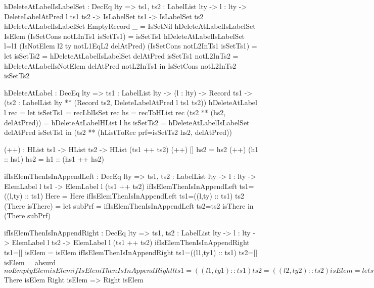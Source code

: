 \begin{code}
hDeleteAtLabelIsLabelSet : DecEq lty => 
  {ts1, ts2 : LabelList lty} -> {l : lty} -> 
  DeleteLabelAtPred l ts1 ts2 -> IsLabelSet ts1 -> IsLabelSet ts2
hDeleteAtLabelIsLabelSet EmptyRecord _ = IsSetNil
hDeleteAtLabelIsLabelSet IsElem (IsSetCons notLInTs1 isSetTs1) = 
  isSetTs1
hDeleteAtLabelIsLabelSet {l=l1} (IsNotElem {l2} {ty} notL1EqL2 
  delAtPred) (IsSetCons notL2InTs1 isSetTs1) = 
  let isSetTs2 = hDeleteAtLabelIsLabelSet delAtPred isSetTs1
      notL2InTs2 = hDeleteAtLabelIsNotElem delAtPred notL2InTs1
  in IsSetCons notL2InTs2 isSetTs2

hDeleteAtLabel : DecEq lty => {ts1 : LabelList lty} -> 
  (l : lty) -> Record ts1 ->
  (ts2 : LabelList lty ** (Record ts2, DeleteLabelAtPred l ts1 ts2))
hDeleteAtLabel l rec =
  let 
    isSetTs1 = recLblIsSet rec
    hs = recToHList rec
    (ts2 ** (hs2, delAtPred)) = hDeleteAtLabelHList l hs
    isSetTs2 = hDeleteAtLabelIsLabelSet delAtPred isSetTs1
  in (ts2 ** (hListToRec {prf=isSetTs2} hs2, delAtPred))

(++) : HList ts1 -> HList ts2 -> HList (ts1 ++ ts2)
(++) [] hs2 = hs2
(++) (h1 :: hs1) hs2 = h1 :: (hs1 ++ hs2)

ifIsElemThenIsInAppendLeft : DecEq lty => 
  {ts1, ts2 : LabelList lty} -> {l : lty} ->
  ElemLabel l ts1 -> ElemLabel l (ts1 ++ ts2)
ifIsElemThenIsInAppendLeft {ts1=((l,ty) :: ts1)} Here = Here
ifIsElemThenIsInAppendLeft {ts1=((l,ty) :: ts1)} {ts2} 
  (There isThere) = 
  let subPrf = ifIsElemThenIsInAppendLeft {ts2=ts2} isThere
  in (There subPrf)

ifIsElemThenIsInAppendRight : DecEq lty => 
  {ts1, ts2 : LabelList lty} -> {l : lty} ->
  ElemLabel l ts2 -> ElemLabel l (ts1 ++ ts2)
ifIsElemThenIsInAppendRight {ts1=[]} isElem = isElem
ifIsElemThenIsInAppendRight {ts1=((l1,ty1) :: ts1)} {ts2=[]} 
  isElem = absurd $ noEmptyElem isElem
ifIsElemThenIsInAppendRight {l} {ts1=((l1,ty1) :: ts1)} 
  {ts2=((l2,ty2) :: ts2)} isElem = 
  let subPrf = 
        ifIsElemThenIsInAppendRight {ts1=ts1} 
          {ts2=((l2,ty2)::ts2)} {l=l} isElem
  in There subPrf

ifIsInOneThenIsInAppend : DecEq lty => 
  {ts1, ts2 : LabelList lty} -> {l : lty} ->
  Either (ElemLabel l ts1) (ElemLabel l ts2) -> 
  ElemLabel l (ts1 ++ ts2)
ifIsInOneThenIsInAppend (Left isElem) = 
  ifIsElemThenIsInAppendLeft isElem    
ifIsInOneThenIsInAppend {ts1} {ts2} {l} (Right isElem) = 
  ifIsElemThenIsInAppendRight isElem     

ifIsInAppendThenIsInOne : DecEq lty => 
  {ts1, ts2 : LabelList lty} -> {l : lty} ->
  ElemLabel l (ts1 ++ ts2) -> 
  Either (ElemLabel l ts1) (ElemLabel l ts2)
ifIsInAppendThenIsInOne {ts1=[]} isElem = (Right isElem)
ifIsInAppendThenIsInOne {ts1=((l1,ty1) :: ts1)} Here = (Left Here)
ifIsInAppendThenIsInOne {l} {ts1=((l1,ty) :: ts1)} 
  (There isThere) =
  case (ifIsInAppendThenIsInOne isThere) of
    Left isElem => Left $ There isElem
    Right isElem => Right isElem
    

\end{code}
